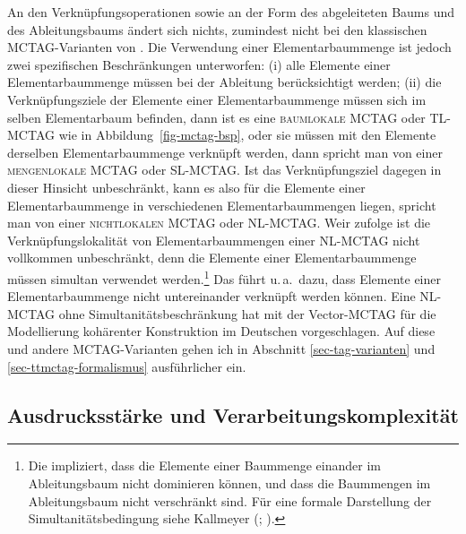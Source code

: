 An den Verknüpfungsoperationen sowie an der Form des abgeleiteten Baums und des Ableitungsbaums ändert sich nichts, zumindest nicht bei den klassischen MCTAG-Varianten von \cite{Weir:88}. Die Verwendung einer Elementarbaummenge ist jedoch zwei spezifischen Beschränkungen unterworfen: (i) alle Elemente einer Elementarbaummenge müssen bei der Ableitung berücksichtigt werden; (ii) die Verknüpfungsziele der Elemente einer Elementarbaummenge müssen sich im selben  Elementarbaum befinden, dann ist es eine \textsc{baumlokale MCTAG} oder \textsc{TL-MCTAG} wie in Abbildung~\ref{fig-mctag-bsp}, oder sie müssen mit den Elemente derselben Elementarbaummenge verknüpft werden, dann spricht man von einer \textsc{mengenlokale MCTAG} oder \textsc{SL-MCTAG}. Ist das Verknüpfungsziel dagegen in dieser Hinsicht unbeschränkt, kann es also für die Elemente einer Elementarbaummenge in verschiedenen Elementarbaummengen liegen, spricht man von einer \textsc{nichtlokalen MCTAG} oder \textsc{NL-MCTAG}. Weir zufolge ist die Verknüpfungslokalität von Elementarbaummengen einer NL-MCTAG nicht vollkommen unbeschränkt, denn die Elemente einer Elementar\-baummenge müssen simultan verwendet werden.\footnote{Die  impliziert, dass die Elemente einer Baummenge einander im Ableitungsbaum nicht dominieren können, und dass die Baummengen im Ableitungsbaum nicht verschränkt sind. Für eine formale Darstellung der Simultanitätsbedingung siehe Kallmeyer (\citeyear[197]{Kallmeyer:05}; \citeyear[65f]{Kallmeyer:09}).} Das führt u.\,a.\ dazu, dass Elemente einer Elementarbaummenge nicht untereinander verknüpft werden können. Eine NL-MCTAG ohne Simultanitätsbeschränkung hat \cite{Rambow:94} mit der Vector-MCTAG für die Modellierung kohärenter Konstruktion im Deutschen vorgeschlagen. Auf diese und andere MCTAG-Varianten gehen ich in Abschnitt \ref{sec-tag-varianten} und \ref{sec-ttmctag-formalismus} ausführlicher ein. 

\subsection{Ausdrucksstärke und Verarbeitungskomplexität}\label{sec:ausdrucksstaerke}

